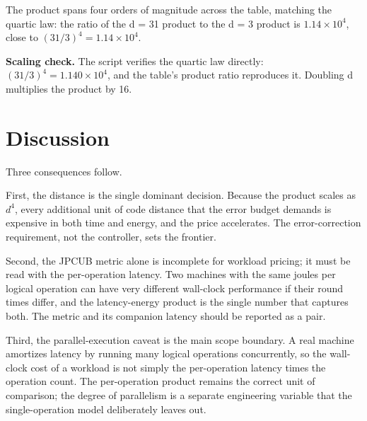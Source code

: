 \documentclass[11pt]{article}
\begin{document}
The product spans four orders of magnitude across the table, matching the quartic law: the ratio of the d = 31 product to the d = 3 product is $1.14\times 10^{4}$, close to $(31/3)^{4} = 1.14\times 10^{4}$.

\textbf{Scaling check.} The script verifies the quartic law directly: $(31/3)^{4} = 1.140\times 10^{4}$, and the table's product ratio reproduces it. Doubling d multiplies the product by 16.

\section{Discussion}
Three consequences follow.

First, the distance is the single dominant decision. Because the product scales as $d^{4}$, every additional unit of code distance that the error budget demands is expensive in both time and energy, and the price accelerates. The error-correction requirement, not the controller, sets the frontier.

Second, the JPCUB metric alone is incomplete for workload pricing; it must be read with the per-operation latency. Two machines with the same joules per logical operation can have very different wall-clock performance if their round times differ, and the latency-energy product is the single number that captures both. The metric and its companion latency should be reported as a pair.

Third, the parallel-execution caveat is the main scope boundary. A real machine amortizes latency by running many logical operations concurrently, so the wall-clock cost of a workload is not simply the per-operation latency times the operation count. The per-operation product remains the correct unit of comparison; the degree of parallelism is a separate engineering variable that the single-operation model deliberately leaves out.
\end{document}
